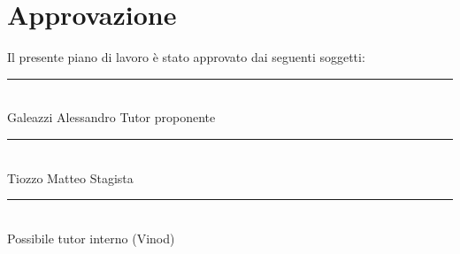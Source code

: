 \section*{Approvazione}
Il presente piano di lavoro è stato approvato dai seguenti soggetti:

\vspace{3cm}

\begin{flushleft}
    \rule{0.6\linewidth}{0.3mm} \\

    Galeazzi Alessandro \hspace{2cm} Tutor proponente 

    \vspace{3cm}

    \rule{0.6\linewidth}{0.3mm} \\ 

    Tiozzo Matteo \hspace{3.3cm} Stagista 

    \vspace{3cm}

    \rule{0.6\linewidth}{0.3mm} \\ 

    Possibile tutor interno (Vinod)
\end{flushleft}


